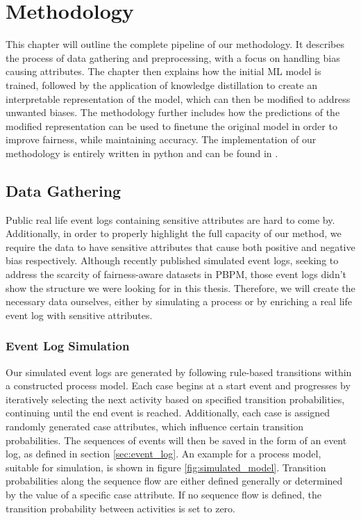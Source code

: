 \chapter{Methodology}
\label{sec:methodology}
This chapter will outline the complete pipeline of our methodology.
It describes the process of data gathering and preprocessing,
with a focus on handling bias
causing attributes.
The chapter then explains how the initial ML model is trained,
followed by the application of knowledge distillation to create an interpretable
representation of the model, which can then be modified to address unwanted biases.
The methodology further includes how the predictions of the modified representation
can be used to finetune the original model in order to improve fairness, while maintaining accuracy.
The implementation of our methodology is entirely written in python and can be found in \cite{implementation}.

\section{Data Gathering}
Public real life event logs
containing sensitive attributes are hard to come by.
Additionally, in order to properly highlight the full capacity of our method,
we require the data to have sensitive attributes
that cause both positive and negative bias respectively.
Although \cite{simulated_logs} recently published simulated event logs,
seeking to address the scarcity of fairness-aware datasets in PBPM,
those event logs didn't show the structure we were looking for in this thesis.
Therefore, we will create the necessary data ourselves,
either by simulating a process or by enriching a real life event log with sensitive attributes.

\subsection{Event Log Simulation}
Our simulated event logs are generated by following rule-based transitions within a constructed process model.
Each case begins at a start event and progresses by iteratively selecting the next activity
based on specified transition probabilities, continuing until the end event is reached.
Additionally, each case is assigned randomly generated case attributes, which influence certain transition probabilities.
The sequences of events will then be saved in the form of an event log, as defined in section \ref{sec:event_log}.
An example for a process model, suitable for simulation, is shown in figure \ref{fig:simulated_model}.
Transition probabilities along the sequence flow are either defined generally
or determined by the value of a specific case attribute.
If no sequence flow is defined, the transition probability between activities is set to zero.

